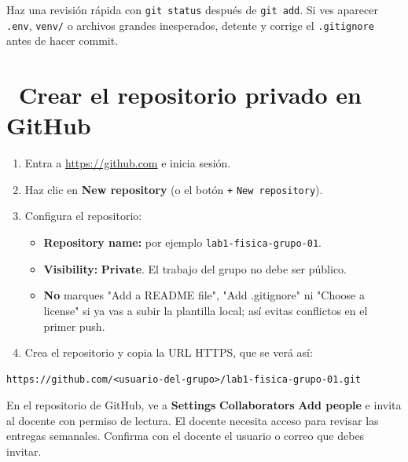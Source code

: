 \documentclass[11pt,a4paper]{article}
\newcommand{\iconotexto}[2]{\textcolor{cyanNeon}{\faIcon{#1}}~#2}
\begin{document}
\begin{cajaReto}
Haz una revisión rápida con \texttt{git status} después de \texttt{git add}. Si ves aparecer \texttt{.env}, \texttt{venv/} o archivos grandes inesperados, detente y corrige el \texttt{.gitignore} antes de hacer commit.
\end{cajaReto}

\section{\iconotexto{github}{Crear el repositorio privado en GitHub}}

\begin{enumerate}[leftmargin=1.6em,itemsep=4pt,topsep=2pt]
  \item Entra a \url{https://github.com} e inicia sesión.
  \item Haz clic en \textbf{New repository} (o el botón \texttt{+} \textrightarrow{} \texttt{New repository}).
  \item Configura el repositorio:
  \begin{itemize}[leftmargin=1.4em,itemsep=2pt,topsep=2pt]
    \item \textbf{Repository name:} por ejemplo \texttt{lab1-fisica-grupo-01}.
    \item \textbf{Visibility:} \textbf{Private}. El trabajo del grupo no debe ser público.
    \item \textbf{No} marques "Add a README file", "Add .gitignore" ni "Choose a license" si ya vas a subir la plantilla local; así evitas conflictos en el primer push.
  \end{itemize}
  \item Crea el repositorio y copia la URL HTTPS, que se verá así:
\end{enumerate}

\begin{lstlisting}
https://github.com/<usuario-del-grupo>/lab1-fisica-grupo-01.git
\end{lstlisting}

\begin{tcolorbox}[tarjetaDato,title={\faIcon{user-plus}~Agregar al docente como colaborador}]
En el repositorio de GitHub, ve a \textbf{Settings} \textrightarrow{} \textbf{Collaborators} \textrightarrow{} \textbf{Add people} e invita al docente con permiso de lectura. El docente necesita acceso para revisar las entregas semanales. Confirma con el docente el usuario o correo que debes invitar.
\end{tcolorbox}
\end{document}
